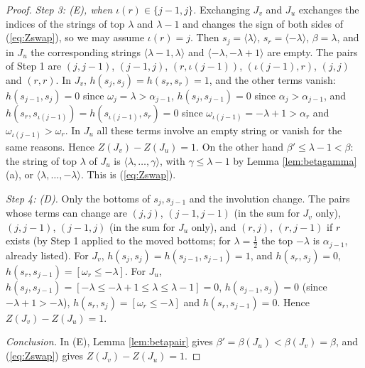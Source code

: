 \documentclass[a4paper,12pt,leqno]{amsart}
\theoremstyle{plain}
\theoremstyle{definition}
\begin{document}
\begin{proof}
\emph{Step 3: (E), when $\iota(r)\in\{j-1,j\}$.} Exchanging $J_v$ and $J_u$ exchanges the indices of the
strings of top $\lambda$ and $\lambda-1$ and changes the sign of both sides of (\ref{eq:Zswap}), so we
may assume $\iota(r)=j$. Then $s_j=\langle\lambda\rangle$, $s_r=\langle-\lambda\rangle$, $\beta=\lambda$,
and in $J_u$ the corresponding strings $\langle\lambda-1,\lambda\rangle$ and
$\langle-\lambda,-\lambda+1\rangle$ are empty. The pairs of Step 1 are $(j,j-1)$, $(j-1,j)$,
$(r,\iota(j-1))$, $(\iota(j-1),r)$, $(j,j)$ and $(r,r)$. In $J_v$, $h(s_j,s_j)=h(s_r,s_r)=1$, and the other
terms vanish: $h(s_{j-1},s_j)=0$ since $\omega_j=\lambda>\alpha_{j-1}$, $h(s_j,s_{j-1})=0$ since $\alpha_j>\alpha_{j-1}$,
and $h(s_r,s_{\iota(j-1)})=h(s_{\iota(j-1)},s_r)=0$ since $\omega_{\iota(j-1)}=-\lambda+1>\alpha_r$ and
$\omega_{\iota(j-1)}>\omega_r$. In $J_u$ all these terms involve an empty string or vanish for the same reasons.
Hence $Z(J_v)-Z(J_u)=1$. On the other hand $\beta'\leq\lambda-1<\beta$: the string of top $\lambda$ of
$J_u$ is $\langle\lambda,\ldots,\gamma\rangle$, with $\gamma\leq\lambda-1$ by Lemma \ref{lem:betagamma}(a), or
$\langle\lambda,\ldots,-\lambda\rangle$. This is (\ref{eq:Zswap}).

\emph{Step 4: (D).} Only the bottoms of $s_j,s_{j-1}$ and the involution change. The pairs whose terms
can change are $(j,j)$, $(j-1,j-1)$ (in the sum for $J_v$ only), $(j,j-1)$, $(j-1,j)$ (in the sum for
$J_u$ only), and $(r,j)$, $(r,j-1)$ if $r$ exists (by Step 1 applied to the moved bottoms; for
$\lambda=\tfrac12$ the top $-\lambda$ is $\alpha_{j-1}$, already listed). For $J_v$,
$h(s_j,s_j)=h(s_{j-1},s_{j-1})=1$, and $h(s_r,s_j)=0$, $h(s_r,s_{j-1})=[\omega_r\leq-\lambda]$. For $J_u$,
$h(s_j,s_{j-1})=[-\lambda\leq-\lambda+1\leq\lambda\leq\lambda-1]=0$, $h(s_{j-1},s_j)=0$ (since
$-\lambda+1>-\lambda$), $h(s_r,s_j)=[\omega_r\leq-\lambda]$ and $h(s_r,s_{j-1})=0$. Hence
$Z(J_v)-Z(J_u)=1$.

\emph{Conclusion.} In (E), Lemma \ref{lem:betapair} gives $\beta'=\beta(J_u)<\beta(J_v)=\beta$, and
(\ref{eq:Zswap}) gives $Z(J_v)-Z(J_u)=1$.
\end{proof}
\end{document}
